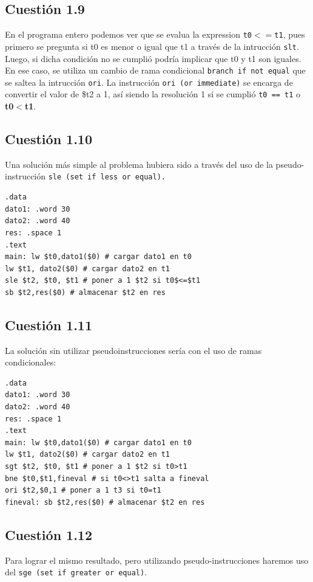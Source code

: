 \documentclass[11pt]{article}
\begin{document}
\begin{large}
\begin{flushleft}
\subsection*{Cuestión 1.9}
En el programa entero podemos ver que se evalua la expression \texttt{t0$<=$t1}, pues primero se pregunta si t0 es menor o igual que t1 a través de la intrucción \texttt{slt}. Luego, si dicha condición no se cumplió podría implicar que t0 y t1 son iguales. En ese caso, se utiliza un cambio de rama condicional \texttt{branch if not equal} que se saltea la intrucción \texttt{ori}. La instrucción \texttt{ori (or immediate)} se encarga de convertir el valor de \$t2 a 1, así siendo la resolución 1 si se cumplió \texttt{t0 == t1} o \textbf{t0$<$t1}.

\subsection*{Cuestión 1.10}
Una solución más simple al problema hubiera sido a través del uso de la pseudo-instrucción \texttt{sle (set if less or equal).}

\begin{listing}[h]
\begin{verbatim}
.data
dato1: .word 30
dato2: .word 40
res: .space 1
.text
main: lw $t0,dato1($0) # cargar dato1 en t0
lw $t1, dato2($0) # cargar dato2 en t1
sle $t2, $t0, $t1 # poner a 1 $t2 si t0$<=$t1
sb $t2,res($0) # almacenar $t2 en res
\end{verbatim}
\end{listing}

\subsection*{Cuestión 1.11}
La solución sin utilizar pseudoinstrucciones sería con el uso de ramas condicionales:

\begin{listing}[h]
\begin{verbatim}
.data
dato1: .word 30
dato2: .word 40
res: .space 1
.text
main: lw $t0,dato1($0) # cargar dato1 en t0
lw $t1, dato2($0) # cargar dato2 en t1
sgt $t2, $t0, $t1 # poner a 1 $t2 si t0>t1
bne $t0,$t1,fineval # si t0<>t1 salta a fineval
ori $t2,$0,1 # poner a 1 t3 si t0=t1
fineval: sb $t2,res($0) # almacenar $t2 en res
\end{verbatim}
\end{listing}

\subsection*{Cuestión 1.12}
Para lograr el mismo resultado, pero utilizando pseudo-instrucciones haremos uso del \texttt{sge (set if greater or equal)}.


\end{flushleft}
\end{large}
\end{document}
